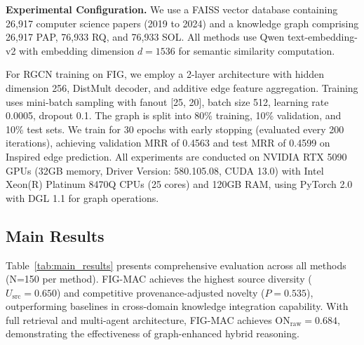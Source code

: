 \documentclass[runningheads]{llncs}
\begin{document}
\textbf{Experimental Configuration.} We use a FAISS vector database containing 26,917 computer science papers (2019 to 2024) and a knowledge graph comprising 26,917 PAP, 76,933 RQ, and 76,933 SOL. All methods use Qwen text-embedding-v2 with embedding dimension $d=1536$ for semantic similarity computation.

For RGCN training on FIG, we employ a 2-layer architecture with hidden dimension 256, DistMult decoder, and additive edge feature aggregation. Training uses mini-batch sampling with fanout [25, 20], batch size 512, learning rate 0.0005, dropout 0.1. The graph is split into 80\% training, 10\% validation, and 10\% test sets. We train for 30 epochs with early stopping (evaluated every 200 iterations), achieving validation MRR of 0.4563 and test MRR of 0.4599 on Inspired edge prediction. All experiments are conducted on NVIDIA RTX 5090 GPUs (32GB memory, Driver Version: 580.105.08, CUDA 13.0) with Intel Xeon(R) Platinum 8470Q CPUs (25 cores) and 120GB RAM, using PyTorch 2.0 with DGL 1.1 for graph operations.


\subsection{Main Results}
\label{sec:main_results}

Table~\ref{tab:main_results} presents comprehensive evaluation across all methods (N=150 per method). FIG-MAC achieves the highest source diversity ($U_{\text{src}} = \mathbf{0.650}$) and competitive provenance-adjusted novelty ($P=0.535$), outperforming baselines in cross-domain knowledge integration capability. With full retrieval and multi-agent architecture, FIG-MAC achieves ON$_{\text{raw}}=0.684$, demonstrating the effectiveness of graph-enhanced hybrid reasoning.
\end{document}
